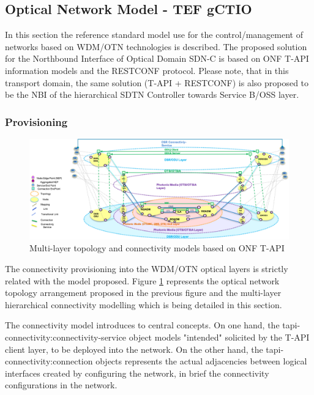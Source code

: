 \documentclass[a4paper,fleqn]{cas-dc}
\begin{document}
\subsection{Optical Network Model - TEF gCTIO}
\label{section:OPTmodels}

In this section the reference standard model use for the control/management of networks based on WDM/OTN technologies is described. The proposed solution for the Northbound Interface of Optical Domain SDN-C is based on ONF T-API information models and the RESTCONF protocol. Please note, that in this transport domain, the same solution (T-API + RESTCONF) is also proposed to be the NBI of the hierarchical SDTN Controller towards Service B/OSS layer.

\subsubsection{Provisioning}

\begin{figure}
	\centering
		\includegraphics[scale=0.8]{figs/ONF-T-API.png}
	\caption{Multi-layer topology and connectivity models based on ONF T-API}
	\label{FIG:ONF-T-API}
\end{figure}

The connectivity provisioning into the WDM/OTN optical layers is strictly related with the model proposed. Figure \ref{FIG:ONF-T-API} represents the optical network topology arrangement proposed in the previous figure and the multi-layer hierarchical connectivity modelling which is being detailed in this section.

The connectivity model introduces to central concepts. On one hand, the tapi-connectivity:connectivity-service  object models "intended" solicited by the T-API client layer, to be deployed into the network. On the other hand, the tapi-connectivity:connection objects represents the actual adjacencies between logical interfaces created by configuring the network, in brief the connectivity configurations in the network. 
\end{document}
